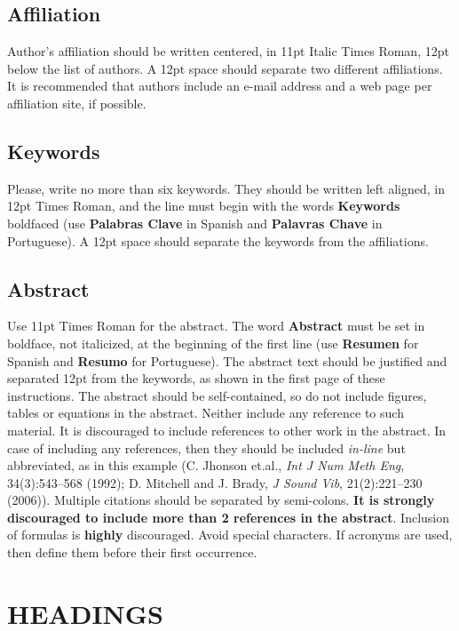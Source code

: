 \documentclass[oneside,a4paper,english,links]{amca}
\begin{document}
\subsection{Affiliation}

Author's affiliation should be written centered, in 11pt Italic Times Roman,
12pt below the list of authors. A 12pt space should separate two
different affiliations. It is recommended that authors include an
e-mail address and a web page per affiliation site, if possible. 

\subsection{Keywords}

Please, write no more than six keywords.  They should be written left
aligned, in 12pt Times Roman, and the line must begin with the words
{\bf Keywords} boldfaced (use {\bf Palabras Clave} in Spanish and {\bf
Palavras Chave} in Portuguese). A 12pt space should separate the
keywords from the affiliations.

\subsection{Abstract}

Use 11pt Times Roman for the abstract. The word {\bf Abstract} must be
set in boldface, not italicized, at the beginning of the first line
(use {\bf Resumen} for Spanish and {\bf Resumo} for Portuguese). The
abstract text should be justified and separated 12pt from the
keywords, as shown in the first page of these instructions. The
abstract should be self-contained, so do not include figures, tables
or equations in the abstract. Neither include any reference to such
material. It is discouraged to include references to other work in the
abstract. In case of including any references, then they should be
included \emph{in-line} but abbreviated, as in this example (C. Jhonson
et.al., \emph{Int J Num Meth Eng}, 34(3):543--568 (1992); D. Mitchell and
J. Brady, \emph{J Sound Vib}, 21(2):221--230 (2006)). Multiple citations
should be separated by semi-colons. \textbf{It is strongly discouraged
to include more than 2 references in the abstract}. Inclusion of
formulas is \textbf{highly} discouraged. Avoid special
characters. If acronyms are used, then define them before their first
occurrence. 

\section{HEADINGS}
\end{document}
